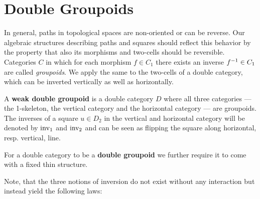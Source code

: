 \section{Double Groupoids}

In general, paths in topological spaces are non-oriented or can be reverse.
Our algebraic structures describing paths and squares should reflect this behavior
by the property that also its morphisms and two-cells should be reversible.
Categories $C$ in which for each morphism $f \in C_1$ there exists an inverse
$f^{-1} \in C_1$ are called \emph{groupoids}. We apply the same to the two-cells of a
double category, which can be inverted vertically as well as horizontally.

\begin{defn} \label{def:weak-dbl-gpd}
A \textbf{weak double groupoid} is a double category $D$ where all three categories
--- the 1-skeleton, the vertical category and the horizontal category --- are
groupoids. The inverses of a square $u \in D_2$ in the vertical and horizontal category 
will be denoted by $\operatorname{inv_1}$ and $\operatorname{inv_2}$ and can be seen as flipping the square
along horizontal, resp. vertical, line.

For a double category to be a \textbf{double groupoid} we further require it to
come with a fixed thin structure.
\end{defn}

Note, that the three notions of inversion do not exist without any interaction
but instead yield the following laws:


